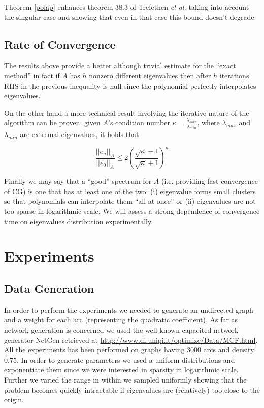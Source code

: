 \documentclass[12pt]{article}
\newcommand{\1}{\mathbbm{1}}
\begin{document}
 Theorem \ref{polap} enhances theorem 38.3 of Trefethen {\em et al.} \cite{trefethen97} taking into account the singular case and showing that even in that case this bound doesn't degrade.

\subsection{Rate of Convergence}
The results above provide a better although trivial estimate for the ``exact method'' in fact if $A$ has $h$ nonzero different eigenvalues then after $h$ iterations RHS in the previous inequality is null since the polynomial perfectly interpolates eigenvalues.

On the other hand a more technical result involving the iterative nature of the algorithm can be proven: given $A$'s condition number $\kappa = \frac{\lambda_{max}}{\lambda_{min}}$, where $\lambda_{max}$ and $\lambda_{min}$ are extremal eigenvalues, it holds that

$$ \frac{||e_n||_A}{||e_0||_A} \leq 2 \left(\frac{\sqrt{\kappa} - 1}{\sqrt{\kappa} + 1}\right)^n $$

Finally we may say that a ``good'' spectrum for $A$ (i.e. providing fast convergence of CG) is one that has at least one of the two: (i) eigenvalue forms small clusters so that polynomials can interpolate them ``all at once'' or (ii) eigenvalues are not too sparse in logarithmic scale. We will assess a strong dependence of convergence time on eigenvalues distribution experimentally. 

\section{Experiments}
\subsection{Data Generation}
In order to perform the experiments we needed to generate an undirected graph and a weight for each arc (representing the quadratic coefficient). As far as network generation is concerned we used the well-known capacited network generator NetGen retrieved at \href{http://www.di.unipi.it/optimize/Data/MCF.html}{http://www.di.unipi.it/optimize/Data/MCF.html}. All the experiments has been performed on graphs having 3000 arcs and density 0.75. In order to generate parameters we used a uniform distributions and exponentiate them since we were interested in sparsity in logarithmic scale. Further we varied the range in within we sampled uniformly showing that the problem becomes quickly intractable if eigenvalues are (relatively) too close to the origin.
\end{document}
